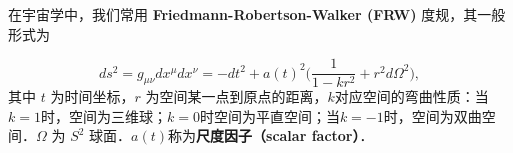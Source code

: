 
在宇宙学中，我们常用 \textbf{Friedmann-Robertson-Walker (FRW)} 度规，其一般形式为

\begin{equation}
ds^2=g_{\mu\nu}dx^{\mu}dx^{\nu}=-dt^2+a(t)^2\Big(\frac{1}{1-kr^2}+r^2 d\Omega^2\Big),
\end{equation}
其中 $t$ 为时间坐标，$r$ 为空间某一点到原点的距离，$k$对应空间的弯曲性质：当$k=1$时，空间为三维球；$k=0$时空间为平直空间；当$k=-1$时，空间为双曲空间．$\Omega$ 为 $S^2$ 球面．$a(t)$称为\textbf{尺度因子（scalar factor）}．


